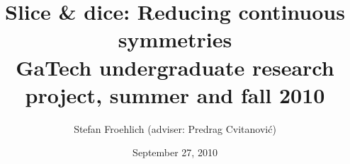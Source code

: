 
        \title{\Huge
Slice \& dice: Reducing continuous symmetries
\\
{\LARGE GaTech undergraduate research project, summer and fall 2010}
        \\\vspace{1.0cm}
        }\author{
Stefan Froehlich %
(adviser: Predrag Cvitanovi\'{c})
    }
        \date{September 27, 2010} \Private{\date{\today}}

    \ifarticle
    \else
    \fi %
